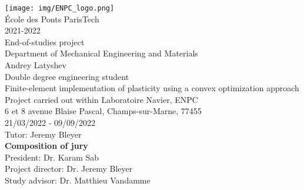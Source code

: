 \documentclass[12pt]{article}
\begin{document}
\begin{titlepage}
	{
        \center
	    \texttt{[image: img/ENPC\_logo.png]}\\[.44cm]
	    {\large École des Ponts ParisTech}\\[0.2cm]
	    {\normalsize 2021-2022}\\[.64cm]

	    {\Large End-of-studies project}\\[.5cm]
        {\large Department of Mechanical Engineering and Materials}\\[.85cm]
        {\Large Andrey Latyshev}\\[1cm]    
        {\large Double degree engineering student}\\[.85cm]

        {\Large Finite-element implementation of plasticity using a convex optimization approach}\\[1cm]
        {\normalsize Project carried out within Laboratoire Navier, ENPC}\\[0.2cm]
	    {\normalsize 6 et 8 avenue Blaise Pascal, Champs-sur-Marne, 77455}\\[0.2cm]
        {\normalsize 21/03/2022 - 09/09/2022}\\[1.1cm]

        {\large Tutor: Jeremy Bleyer}\\[1.1cm]
    }
    \noindent \textbf{\normalsize Composition of jury}\\
    {\normalsize President: Dr. Karam Sab}\\
    {\normalsize Project director: Dr. Jeremy Bleyer}\\
    {\normalsize Study advisor: Dr. Matthieu Vandamme}
\end{titlepage}


\end{document}
